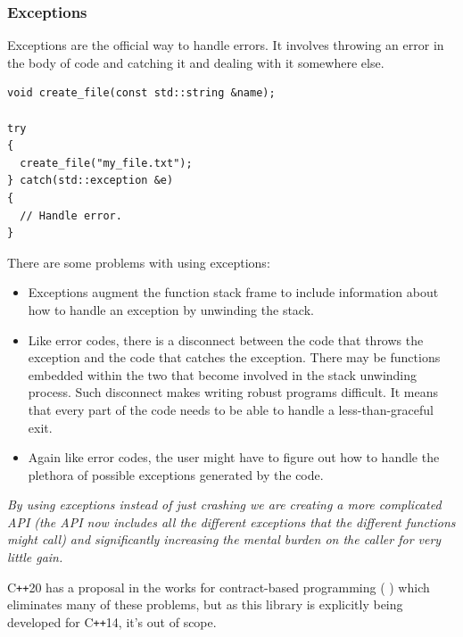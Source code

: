 \documentclass[12pt]{report}
\newcommand{\citebu}[1]{(\citenoparen{#1})}
\newcommand{\citenoparen}[1]{\citeauthor{#1} \citeyear{#1}}
\newcommand{\cpp}{C\texttt{++}}
\newcommand{\quotebu}[2]
{
  \begin{displayquote}[\citenoparen{#2}]
    \textit{#1}
  \end{displayquote}
}
\theoremstyle{definition}
\begin{document}
        \subsubsection{Exceptions}

          Exceptions are the official way to handle errors. It involves
          throwing an error in the body of code and catching it and dealing
          with it somewhere else.

          \vspace{5mm}
          \begin{lstlisting}
void create_file(const std::string &name);

try
{
  create_file("my_file.txt");
} catch(std::exception &e)
{
  // Handle error.
}
          \end{lstlisting}
          \vspace{5mm}

          There are some problems with using exceptions:

          \begin{itemize}
            \item Exceptions augment the function stack frame to include
              information about how to handle an exception by unwinding the stack.
            \item Like error codes, there is a disconnect between the code
              that throws the exception and the code that catches the exception.
              There may be functions embedded within the two that become
              involved in the stack unwinding process. Such disconnect makes
              writing robust programs difficult. It means that every part of
              the code needs to be able to handle a less-than-graceful exit.
            \item Again like error codes, the user might have to figure out
              how to handle the plethora of possible exceptions generated by
              the code.
          \end{itemize}

          \quotebu{
            By using exceptions instead of just crashing we are creating a more
            complicated API (the API now includes all the different exceptions
            that the different functions might call) and significantly
            increasing the mental burden on the caller for very little gain.
          }{gamasutra}

          \cpp20 has a proposal in the works for contract-based programming \citebu{contracts}
          which eliminates many of these problems, but as this library is
          explicitly being developed for \cpp14, it's out of scope. \\
\end{document}
